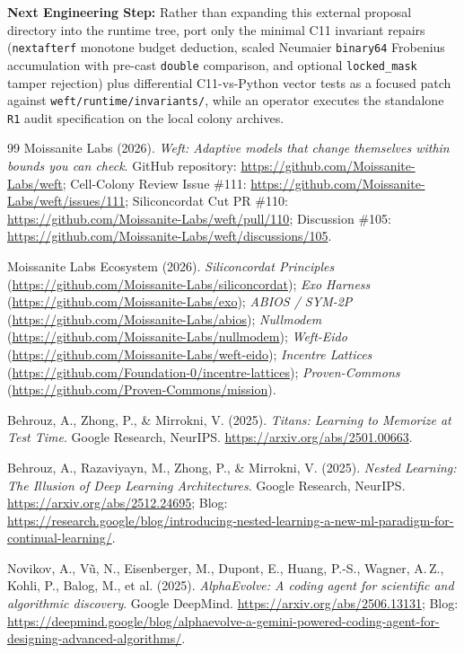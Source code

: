 \documentclass[10pt,a4paper]{article}
\begin{document}
\textbf{Next Engineering Step:} Rather than expanding this external proposal directory into the runtime tree, port only the minimal C11 invariant repairs (\texttt{nextafterf} monotone budget deduction, scaled Neumaier \texttt{binary64} Frobenius accumulation with pre-cast \texttt{double} comparison, and optional \texttt{locked\_mask} tamper rejection) plus differential C11-vs-Python vector tests as a focused patch against \texttt{weft/runtime/invariants/}, while an operator executes the standalone \texttt{R1} audit specification on the local colony archives.

\begin{thebibliography}{99}\small
{}
Moissanite Labs (2026). \emph{Weft: Adaptive models that change themselves within bounds you can check}. GitHub repository: \url{https://github.com/Moissanite-Labs/weft}; Cell-Colony Review Issue \#111: \url{https://github.com/Moissanite-Labs/weft/issues/111}; Siliconcordat Cut PR \#110: \url{https://github.com/Moissanite-Labs/weft/pull/110}; Discussion \#105: \url{https://github.com/Moissanite-Labs/weft/discussions/105}.

Moissanite Labs Ecosystem (2026). \emph{Siliconcordat Principles} (\url{https://github.com/Moissanite-Labs/siliconcordat}); \emph{Exo Harness} (\url{https://github.com/Moissanite-Labs/exo}); \emph{ABIOS / SYM-2P} (\url{https://github.com/Moissanite-Labs/abios}); \emph{Nullmodem} (\url{https://github.com/Moissanite-Labs/nullmodem}); \emph{Weft-Eido} (\url{https://github.com/Moissanite-Labs/weft-eido}); \emph{Incentre Lattices} (\url{https://github.com/Foundation-0/incentre-lattices}); \emph{Proven-Commons} (\url{https://github.com/Proven-Commons/mission}).

Behrouz, A., Zhong, P., \& Mirrokni, V. (2025). \emph{Titans: Learning to Memorize at Test Time}. Google Research, NeurIPS. \url{https://arxiv.org/abs/2501.00663}.

Behrouz, A., Razaviyayn, M., Zhong, P., \& Mirrokni, V. (2025). \emph{Nested Learning: The Illusion of Deep Learning Architectures}. Google Research, NeurIPS. \url{https://arxiv.org/abs/2512.24695}; Blog: \url{https://research.google/blog/introducing-nested-learning-a-new-ml-paradigm-for-continual-learning/}.

Novikov, A., V\~u, N., Eisenberger, M., Dupont, E., Huang, P.-S., Wagner, A.\,Z., Kohli, P., Balog, M., et al. (2025). \emph{AlphaEvolve: A coding agent for scientific and algorithmic discovery}. Google DeepMind. \url{https://arxiv.org/abs/2506.13131}; Blog: \url{https://deepmind.google/blog/alphaevolve-a-gemini-powered-coding-agent-for-designing-advanced-algorithms/}.


\end{thebibliography}
\end{document}
